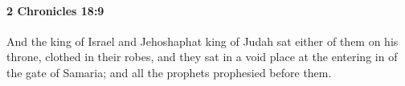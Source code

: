 
		\paragraph{2 Chronicles 18:9} %
			\label{2CHRONICLES-18-9}

			And the king of Israel and Jehoshaphat king of Judah sat either of them on his throne, clothed in their robes, and they sat in a void place at the entering in of the gate of Samaria; and all the prophets prophesied before them.


